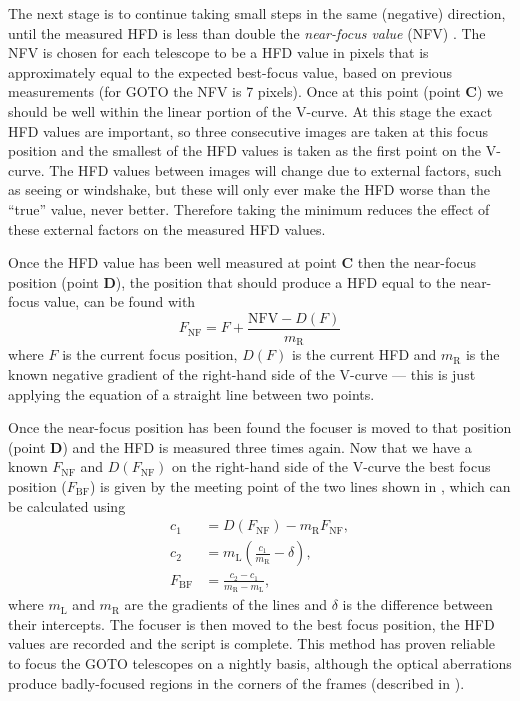 \begin{colsection}
The next stage is to continue taking small steps in the same (negative) direction, until the measured HFD is less than double the \emph{near-focus value} (NFV) . The NFV is chosen for each telescope to be a HFD value in pixels that is approximately equal to the expected best-focus value, based on previous measurements (for GOTO the NFV is 7 pixels). Once at this point (point \textbf{C}) we should be well within the linear portion of the V-curve. At this stage the exact HFD values are important, so three consecutive images are taken at this focus position and the smallest of the HFD values is taken as the first point on the V-curve. The HFD values between images will change due to external factors, such as seeing or windshake, but these will only ever make the HFD worse than the ``true'' value, never better. Therefore taking the minimum reduces the effect of these external factors on the measured HFD values.

Once the HFD value has been well measured at point \textbf{C} then the near-focus position (point \textbf{D}), the position that should produce a HFD equal to the near-focus value, can be found with
%
\begin{equation}
    F_\text{NF} = F + \frac{\text{NFV} - D(F)}{m_\text{R}}
    \label{eq:nearfocus}
\end{equation}
%
where $F$ is the current focus position, $D(F)$ is the current HFD and $m_\text{R}$ is the known negative gradient of the right-hand side of the V-curve --- this is just applying the equation of a straight line between two points.

Once the near-focus position has been found the focuser is moved to that position (point \textbf{D}) and the HFD is measured three times again. Now that we have a known $F_\text{NF}$ and $D(F_\text{NF})$ on the right-hand side of the V-curve the best focus position ($F_\text{BF}$) is given by the meeting point of the two lines shown in , which can be calculated using
%
\begin{equation}
    \begin{split}
                c_1 & = D(F_\text{NF}) - m_\text{R} F_\text{NF}, \\
                c_2 & = m_\text{L}(\frac{c_1}{m_\text{R}} - \delta), \\
        F_\text{BF} & = \frac{c_2 - c_1}{m_\text{R} - m_\text{L}},
    \end{split}
    \label{eq:bestfocus}
\end{equation}
%
where $m_\text{L}$ and $m_\text{R}$ are the gradients of the lines and $\delta$ is the difference between their intercepts. The focuser is then moved to the best focus position, the HFD values are recorded and the script is complete. This method has proven reliable to focus the GOTO telescopes on a nightly basis, although the optical aberrations produce badly-focused regions in the corners of the frames (described in ).


\end{colsection}
